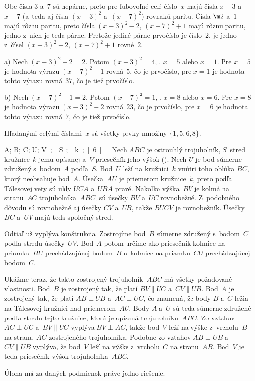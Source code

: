 {%
Obe čísla $3$ a~$7$ sú nepárne, preto pre ľubovoľné celé číslo~$x$
majú čísla $x-3$ a~$x-7$ (a~teda aj čísla $(x-3)^2$ a~$(x-7)^2$)
rovnakú paritu. Čísla $\m2$ a~$1$ majú rôznu paritu, preto čísla
$(x-3)^2-2$, $(x-7)^2+1$ majú rôznu paritu, jedno z~nich je teda
párne. Pretože jediné párne prvočíslo je číslo~$2$, je jedno z~čísel
$(x-3)^2-2$, $(x-7)^2+1$ rovné~$2$.
\item{a)} Nech $(x-3)^2-2=2$. Potom $(x-3)^2=4$, \tj. $x=5$
alebo $x=1$. Pre $x=5$ je hodnota výrazu $(x-7)^2+1$ rovná~$5$, čo
je prvočíslo, pre $x=1$ je hodnota tohto výrazu rovná~$37$, čo je
tiež prvočíslo.
\item{b)} Nech $(x-7)^2+1=2$. Potom $(x-7)^2=1$, \tj. $x=8$
alebo $x=6$. Pre $x=8$ je hodnota výrazu $(x-3)^2-2$ rovná~$23$, čo
je prvočíslo, pre $x=6$ je hodnota tohto výrazu rovná~$7$, čo je
tiež prvočíslo.

Hľadanými celými číslami~$x$ sú všetky prvky množiny $\{1,5,6,8\}$.}

{%
\fontplace
\rpoint A; \lpoint B; \bpoint C;
\lpoint U; \rtpoint\up\unit V; \tpoint S;
\lBpoint k;
[6] \hfil\Obr

Nech $ABC$ je ostrouhlý trojuholník, $S$~stred kružnice~$k$
jemu opísanej a~$V$ priesečník jeho výšok (\obr). Nech $U$ je bod
\inspicture
súmerne združený s~bodom~$A$ podľa~$S$. Bod~$U$ leží na
kružnici~$k$ vnútri toho oblúka $BC$, ktorý neobsahuje bod~$A$.
Úsečka~$AU$ je priemerom kružnice~$k$, preto podľa Tálesovej vety
sú uhly $UCA$ a~$UBA$ pravé. Nakoľko výška~$BV$
je kolmá na stranu~$AC$ trojuholníka~$ABC$, sú úsečky $BV$
a~$UC$ rovnobežné. Z~podobného dôvodu sú rovnobežné aj úsečky
$CV$ a~$UB$, takže $BUCV$ je rovnobežník. Úsečky $BC$ a~$UV$ majú
teda spoločný stred.

Odtiaľ už vyplýva konštrukcia. Zostrojíme bod~$B$ súmerne združený
s~bodom~$C$ podľa stredu úsečky~$UV$. Bod~$A$ potom určíme ako
priesečník kolmice na priamku~$BU$ prechádzajúcej bodom~$B$ a~kolmice
na priamku~$CU$ prechádzajúcej bodom~$C$.

Ukážme teraz, že takto zostrojený trojuholník~$ABC$ má všetky
požadované vlastnosti. Bod~$B$ je zostrojený tak, že platí
$BV\parallel UC$  a~$CV\parallel UB$. Bod~$A$ je zostrojený tak,
že platí $AB\perp UB$ a~$AC\perp UC$, čo znamená, že body $B$
a~$C$ ležia na Tálesovej kružnici nad priemerom~$AU$. Body $A$
a~$U$ sú teda súmerne združené podľa stredu tejto kružnice,
ktorá je opísaná trojuholníku~$ABC$. Zo vzťahov $AC\perp UC$
a~$BV\parallel UC$ vyplýva $BV\perp AC$, takže bod~$V$ leží na
výške z~vrcholu~$B$ na stranu~$AC$ zostrojeného trojuholníka.
Podobne zo vzťahov $AB\perp UB$ a~$CV\parallel UB$ vyplýva, že bod~$V$
leží na výške z~vrcholu~$C$ na stranu~$AB$. Bod~$V$ je teda
priesečník výšok trojuholníka~$ABC$.

Úloha má za daných podmienok práve jedno riešenie.}

